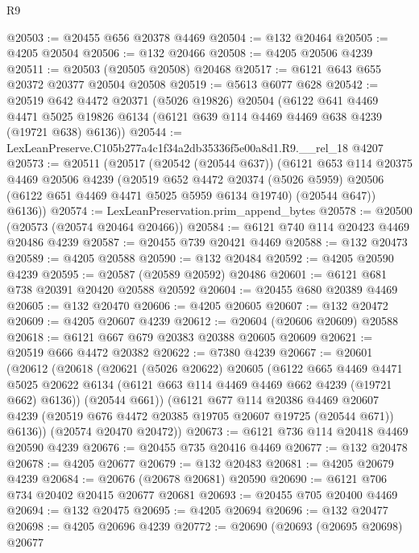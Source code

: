\begin{lexlean}{R9}
\begin{coremodule}
@20503 := @20455 @656 @20378 @4469
@20504 := @132 @20464
@20505 := @4205 @20504
@20506 := @132 @20466
@20508 := @4205 @20506 @4239
@20511 := @20503 (@20505 @20508) @20468
@20517 := @6121 @643 @655 @20372 @20377 @20504 @20508
@20519 := @5613 @6077 @628
@20542 := @20519
    @642
    @4472
    @20371
    (@5026 @19826)
    @20504
    (@6122
      @641
      @4469
      @4471
      @5025
      @19826
      @6134
      (@6121 @639 @114 @4469 @4469 @638 @4239 (@19721 @638) @6136))
@20544 := LexLeanPreserve.C105b277a4c1f34a2db35336f5e00a8d1.R9.__rel_18 @4207
@20573 := @20511
    (@20517
      (@20542 (@20544 @637))
      (@6121
        @653
        @114
        @20375
        @4469
        @20506
        @4239
        (@20519
          @652
          @4472
          @20374
          (@5026 @5959)
          @20506
          (@6122 @651 @4469 @4471 @5025 @5959 @6134 @19740)
          (@20544 @647))
        @6136))
@20574 := LexLeanPreservation.prim_append_bytes
@20578 := @20500 (@20573 (@20574 @20464 @20466))
@20584 := @6121 @740 @114 @20423 @4469 @20486 @4239
@20587 := @20455 @739 @20421 @4469
@20588 := @132 @20473
@20589 := @4205 @20588
@20590 := @132 @20484
@20592 := @4205 @20590 @4239
@20595 := @20587 (@20589 @20592) @20486
@20601 := @6121 @681 @738 @20391 @20420 @20588 @20592
@20604 := @20455 @680 @20389 @4469
@20605 := @132 @20470
@20606 := @4205 @20605
@20607 := @132 @20472
@20609 := @4205 @20607 @4239
@20612 := @20604 (@20606 @20609) @20588
@20618 := @6121 @667 @679 @20383 @20388 @20605 @20609
@20621 := @20519 @666 @4472 @20382
@20622 := @7380 @4239
@20667 := @20601
    (@20612
      (@20618
        (@20621
          (@5026 @20622)
          @20605
          (@6122
            @665
            @4469
            @4471
            @5025
            @20622
            @6134
            (@6121 @663 @114 @4469 @4469 @662 @4239 (@19721 @662) @6136))
          (@20544 @661))
        (@6121
          @677
          @114
          @20386
          @4469
          @20607
          @4239
          (@20519 @676 @4472 @20385 @19705 @20607 @19725 (@20544 @671))
          @6136))
      (@20574 @20470 @20472))
@20673 := @6121 @736 @114 @20418 @4469 @20590 @4239
@20676 := @20455 @735 @20416 @4469
@20677 := @132 @20478
@20678 := @4205 @20677
@20679 := @132 @20483
@20681 := @4205 @20679 @4239
@20684 := @20676 (@20678 @20681) @20590
@20690 := @6121 @706 @734 @20402 @20415 @20677 @20681
@20693 := @20455 @705 @20400 @4469
@20694 := @132 @20475
@20695 := @4205 @20694
@20696 := @132 @20477
@20698 := @4205 @20696 @4239
@20772 := @20690
    (@20693
      (@20695 @20698)
      @20677

\end{coremodule}
\end{lexlean}
